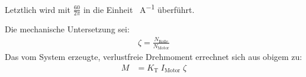		Letztlich wird mit \(\frac{60}{2\pi}\) in die Einheit \unit{\newtonmetre\per\ampere} überführt.\par\medskip
		Die mechanische Untersetzung sei:
		\begin{align}
			\zeta = \frac{N_\text{Rolle}}{N_\text{Motor}}
			\label{eq:reduction}
		\end{align}
		Das vom System erzeugte, verlustfreie Drehmoment errechnet sich aus obigem zu:
		\begin{align}
			M	&= K_\text{T} \; I_\text{Motor} \; \zeta
			\label{eq:frictionless torque}
		\end{align}
		
		\nocite{Meschede.2015}\nocite{Demtroder.2018}